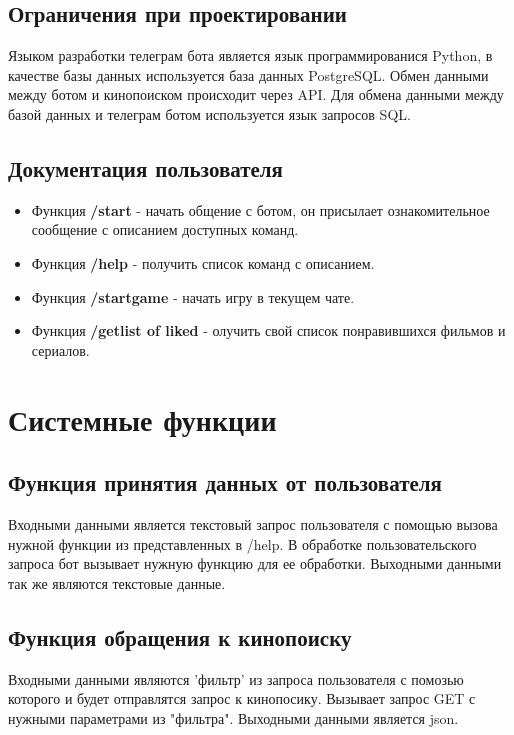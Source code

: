 \documentclass{article}
\begin{document}
\subsection{Ограничения при проектировании}
Языком разработки телеграм бота является язык программированися Python, в качестве базы данных используется база данных PostgreSQL. Обмен данными между ботом и кинопоиском происходит через API. Для обмена данными между базой данных и телеграм ботом используется язык запросов SQL. 

\subsection{Документация пользователя}
\begin{itemize}
    \item Функция \textbf{/start} - начать общение с ботом, он присылает ознакомительное сообщение с описанием доступных команд.
\item Функция \textbf{/help} - получить список команд с описанием.
\item Функция \textbf{/start\textunderscore game} - начать игру в текущем чате.
\item Функция \textbf{/get\textunderscore list \textunderscore of \textunderscore liked} - 
олучить свой список понравившихся фильмов и сериалов.

\end{itemize}

\section{Системные функции}

\subsection{Функция принятия данных от пользователя}

Входными данными является текстовый запрос пользователя с помощью вызова нужной функции из представленных в /help. В обработке пользовательского запроса бот вызывает нужную функцию для ее обработки. Выходными данными так же являются текстовые данные.

\subsection{Функция обращения к кинопоиску}
Входными данными являются 'фильтр' из запроса пользователя с помозью которого и будет отправлятся запрос к кинопосику. Вызывает запрос GET с нужными параметрами из "фильтра". Выходными данными является json.
\end{document}
